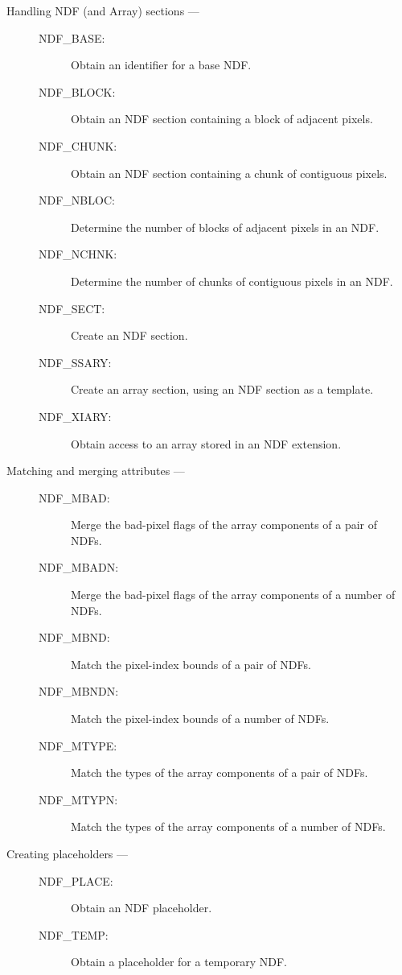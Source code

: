 \begin{description}
\item [Handling NDF (and Array) sections ---]

\begin{description}
\item [NDF\_BASE:]  Obtain an identifier for a base NDF.
\item [NDF\_BLOCK:]  Obtain an NDF section containing a block of adjacent pixels.
\item [NDF\_CHUNK:]  Obtain an NDF section containing a chunk of contiguous pixels.
\item [NDF\_NBLOC:]  Determine the number of blocks of adjacent pixels in an NDF.
\item [NDF\_NCHNK:]  Determine the number of chunks of contiguous pixels in an NDF.
\item [NDF\_SECT:]  Create an NDF section.
\item [NDF\_SSARY:]  Create an array section, using an NDF section as a template.
\item [NDF\_XIARY:]  Obtain access to an array stored in an NDF extension.
\end{description}

\item [Matching and merging attributes ---]

\begin{description}
\item [NDF\_MBAD:]  Merge the bad-pixel flags of the array components of a pair of NDFs.
\item [NDF\_MBADN:]  Merge the bad-pixel flags of the array components of a number of NDFs.
\item [NDF\_MBND:]  Match the pixel-index bounds of a pair of NDFs.
\item [NDF\_MBNDN:]  Match the pixel-index bounds of a number of NDFs.
\item [NDF\_MTYPE:]  Match the types of the array components of a pair of NDFs.
\item [NDF\_MTYPN:]  Match the types of the array components of a number of NDFs.
\end{description}

\item [Creating placeholders ---]

\begin{description}
\item [NDF\_PLACE:]  Obtain an NDF placeholder.
\item [NDF\_TEMP:]  Obtain a placeholder for a temporary NDF.
\end{description}


\end{description}
